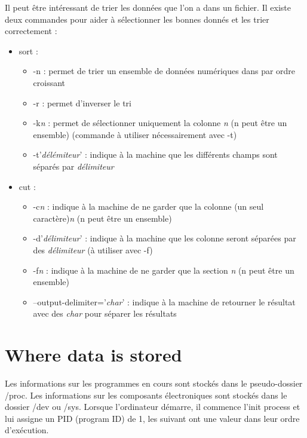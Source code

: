 \documentclass{article}
\begin{document}
Il peut être intéressant de trier les données que l'on a dans un fichier. Il existe deux commandes pour aider à sélectionner les bonnes donnés et les trier correctement :
\begin{itemize}
    \item sort :
        \begin{itemize}
            \item -n : permet de trier un ensemble de données numériques dans par ordre croissant
            \item -r : permet d'inverser le tri
            \item -k\textit{n} : permet de sélectionner uniquement la colonne \textit{n} (n peut être un ensemble) (commande à utiliser nécessairement avec -t)
            \item -t'\textit{délémiteur}' : indique à la machine que les différents champs sont séparés par \textit{délimiteur}
        \end{itemize}
    \item cut :
        \begin{itemize}
            \item -c\textit{n} : indique à la machine de ne garder que la colonne (un seul caractère)\textit{n} (n peut être un ensemble)
            \item -d'\textit{délimiteur}' : indique à la machine que les colonne seront séparées par des \textit{délimiteur} (à utiliser avec -f)
            \item -f\textit{n} : indique à la machine de ne garder que la section \textit{n} (n peut être un ensemble)
            \item --output-delimiter='\textit{char}' : indique à la machine de retourner le résultat avec des \textit{char} pour séparer les résultats
        \end{itemize}
\end{itemize}




\newpage
\section{Where data is stored}
Les informations sur les programmes en cours sont stockés dans le pseudo-dossier /proc. Les informations sur les composants électroniques sont stockés dans le dossier /dev ou /sys. Lorsque l'ordinateur démarre, il commence l'init process et lui assigne un PID (program ID) de 1, les suivant ont une valeur dans leur ordre d'exécution.\newline
\end{document}
